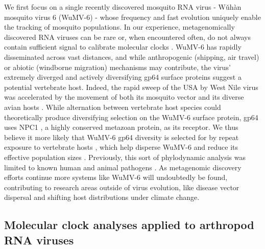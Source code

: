 \documentclass[11pt]{article}
\begin{document}
We first focus on a single recently discovered mosquito RNA virus - W\v{u}h\`{a}n mosquito virus 6 \citep{li_unprecedented_2015} (WuMV-6) - whose frequency and fast evolution uniquely enable the tracking of mosquito populations.
In our experience, metagenomically discovered RNA viruses can be rare or, when encountered often, do not always contain sufficient signal to calibrate molecular clocks \citep{webster_discovery_2015}.
WuMV-6 has rapidly disseminated across vast distances, and while anthropogenic (shipping, air travel) \citep{lounibos_invasions_2002,fonseca_pathways_2006,bataille_evidence_2009} or abiotic (windborne migration) \citep{huestis_windborne_2019} mechanisms may contribute, the virus' extremely diverged and actively diversifying gp64 surface proteins suggest a potential vertebrate host.
Indeed, the rapid sweep of the USA by West Nile virus was accelerated by the movement of both its mosquito vector and its diverse avian hosts \citep{di_giallonardo_fluid_2015}.
While alternation between vertebrate host species could theoretically produce diversifying selection on the WuMV-6 surface protein, gp64 uses NPC1 \citep{li_baculovirus_2019}, a highly conserved metazoan protein, as its receptor.
We thus believe it more likely that WuMV-6 gp64 diversity is selected for by repeat exposure to vertebrate hosts \citep{jong_antigenic_2007}, which help disperse WuMV-6 \citep{lycett_brief_2019} and reduce its effective population sizes \citep{bedford_strength_2011}.
Previously, this sort of phylodynamic analysis was limited to known human and animal pathogens \citep{drummond_measurably_2003,wheeler_spatial_2010}.
As metagenomic discovery efforts continue more systems like WuMV-6 will undoubtedly be found, contributing to research areas outside of virus evolution, like disease vector dispersal and shifting host distributions under climate change.


\subsection{Molecular clock analyses applied to arthropod RNA viruses}
\end{document}
